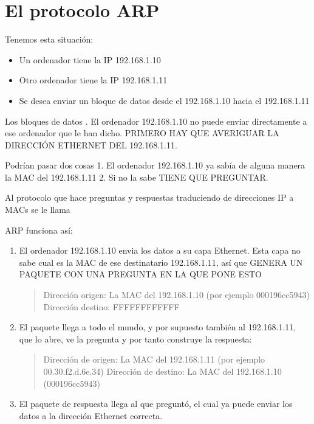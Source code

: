 \documentclass[letterpaper,10pt,spanish]{sphinxmanual}
\begin{document}
\section{El protocolo ARP}
\label{\detokenize{t1_caracterizacion_redes/apuntes_t1:el-protocolo-arp}}
Tenemos esta situación:
\begin{itemize}
\item {} 
Un ordenador tiene la IP 192.168.1.10

\item {} 
Otro ordenador tiene la IP 192.168.1.11

\item {} 
Se desea enviar un bloque de datos desde el 192.168.1.10 hacia el  192.168.1.11

\end{itemize}

Los bloques de datos . El ordenador 192.168.1.10 no puede enviar directamente a ese ordenador que le han dicho. PRIMERO HAY QUE AVERIGUAR LA DIRECCIÓN ETHERNET DEL 192.168.1.11.

Podrían pasar dos cosas
1. El ordenador 192.168.1.10 ya sabía de alguna manera la MAC del 192.168.1.11
2. Si no la sabe TIENE QUE PREGUNTAR.

Al protocolo que hace preguntas y respuestas traduciendo de direcciones IP a MACs se le llama 

ARP funciona así:
\begin{enumerate}
%
\item {} 
El ordenador 192.168.1.10 envia los datos a su capa Ethernet. Esta capa no sabe cual es la MAC de ese destinatario 192.168.1.11, así que GENERA UN PAQUETE CON UNA PREGUNTA EN LA QUE PONE ESTO
\begin{quote}

Dirección origen: La MAC del 192.168.1.10 (por ejemplo  00\sphinxhyphen{}01\sphinxhyphen{}96\sphinxhyphen{}cc\sphinxhyphen{}59\sphinxhyphen{}43)
Dirección destino: FF\sphinxhyphen{}FF\sphinxhyphen{}FF\sphinxhyphen{}FF\sphinxhyphen{}FF\sphinxhyphen{}FF
\end{quote}

\item {} 
El paquete llega a todo el mundo, y por supuesto también al 192.168.1.11, que lo abre, ve la pregunta y por tanto construye la respuesta:
\begin{quote}

Dirección de origen: La MAC del 192.168.1.11 (por ejemplo 00.30.f2.d.6e.34)
Dirección de destino: La MAC del 192.168.1.10 (00\sphinxhyphen{}01\sphinxhyphen{}96\sphinxhyphen{}cc\sphinxhyphen{}59\sphinxhyphen{}43)
\end{quote}

\item {} 
El paquete de respuesta llega al que preguntó, el cual ya puede enviar los datos a la dirección Ethernet correcta.

\end{enumerate}
\end{document}

